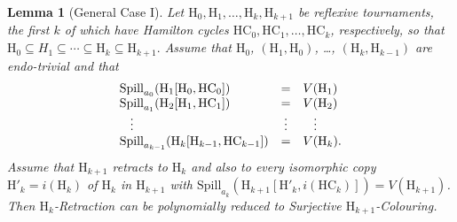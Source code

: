 \documentclass[a4paper,12pt]{article}
\newtheorem{lemma}{Lemma}
\theoremstyle{remark}
\newcommand{\HC}[0]{\ensuremath{\mathrm{HC}}}
\renewcommand{\H}{\ensuremath{\mathrm{H}}}
\begin{document}
\begin{lemma}[General Case I]
Let $\H_{0},\H_{1}, \ldots, \H_k, \H_{k+1}$
be reflexive tournaments, the first $k$ of which have Hamilton cycles $\HC_{0},\HC_{1}, \ldots, \HC_{k}$, respectively,
so that $\H_0 \subseteq H_1 \subseteq \cdots \subseteq \H_k \subseteq \H_{k+1}.$
Assume that $\H_0$, $(\H_1,\H_0)$, \ldots, $(\H_{k},\H_{k-1})$ are endo-trivial and that
\[
\begin{array}{lcl}
\mathrm{Spill}_{a_0}(\H_1[\H_0,\HC_{0}]) &= &V(\H_1) \\
\mathrm{Spill}_{a_1}(\H_2[\H_1,\HC_{1}]) &= &V(\H_2) \\
\hspace*{3mm} \vdots &\vdots &\hspace*{3mm}\vdots \\
\mathrm{Spill}_{a_{k-1}}(\H_{k}[\H_{k-1},\HC_{k-1}]) &= &V(\H_k).\\
\end{array}
\]
Assume that $\H_{k+1}$ retracts to $\H_k$ and also to every isomorphic copy $\H'_{k}=i(\H_k)$ of $\H_k$ in $\H_{k+1}$ with 
$\mathrm{Spill}_{a_k}(\H_{k+1}[\H'_k,i(\HC_{k})]) = V(\H_{k+1})$.
Then $\H_k$-{\sc Retraction} can be polynomially reduced to {\sc Surjective $\H_{k+1}$-Colouring}.
\label{prop:main-general1}
\end{lemma}
\end{document}
